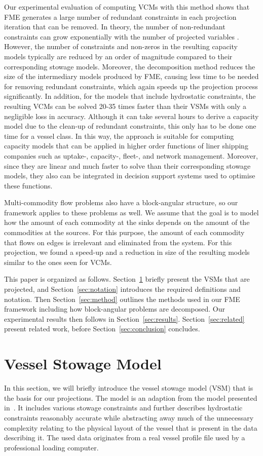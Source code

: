 \documentclass{llncs}
\begin{document}
Our experimental evaluation of computing VCMs with this method shows that FME generates a large number of redundant constraints in each projection iteration that can be removed. In theory, the number of non-redundant constraints can grow exponentially with the number of projected variables \cite{monniaux10}. However, the number of constraints and non-zeros in the resulting capacity models typically are reduced by an order of magnitude compared to their corresponding stowage models. Moreover, the decomposition method reduces the size of the intermediary models produced by FME, causing less time to be needed for removing redundant constraints, which again speeds up the projection process significantly. In addition, for the models that include hydrostatic constraints, the resulting VCMs can be solved 20-35 times faster than their VSMs with only a negligible loss in accuracy. Although it can take several hours to derive a capacity model due to the clean-up of redundant constraints, this only has to be done one time for a vessel class. In this way, the approach is suitable for computing capacity models that can be applied in higher order functions of liner shipping companies such as uptake-, capacity-, fleet-, and network management. Moreover, since they are linear and much faster to solve than their corresponding stowage models, they also can be integrated in decision support systems used to optimise these functions.

Multi-commodity flow problems also have a block-angular structure, so our framework applies to these problems as well. We assume that the goal is to model how the amount of each commodity at the sinks depends on the amount of the commodities at the sources. For this purpose, the amount of each commodity that flows on edges is irrelevant and eliminated from the system. 
For this projection, we found a speed-up and a reduction in size of the resulting models similar to the ones seen for VCMs.

This paper is organized as follows. Section~\ref{sec:model} briefly present the VSMs that are projected, and Section~\ref{sec:notation} introduces the required definitions and notation. 
Then Section~\ref{sec:method} outlines the methods used in our FME framework including how block-angular problems are decomposed. 
Our experimental results then follows in Section~\ref{sec:results}. Section~\ref{sec:related} present related work, before Section~\ref{sec:conclusion} concludes.
%
\section{Vessel Stowage Model}\label{sec:model}
In this section, we will briefly introduce the vessel stowage model (VSM) that is the basis for our projections. The model is an adaption from the model presented in~\cite{ICCL18}. 
It includes various stowage constraints and further describes hydrostatic constraints reasonably accurate while
abstracting away much of the unnecessary complexity relating to the physical layout of the vessel that is present in the data describing it. 
The used data originates from a real vessel profile file used by a professional loading computer. 
\end{document}
